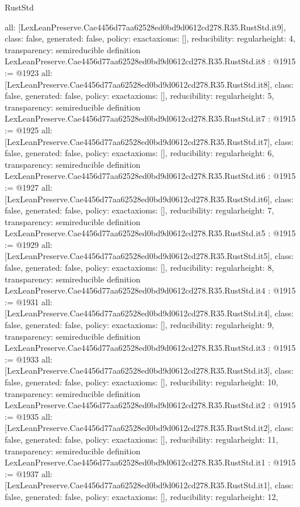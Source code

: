 \begin{lexlean}{RustStd}
\begin{coremodule}
{  all: [LexLeanPreserve.Cae4456d77aa62528ed0bd9d0612cd278.R35.RustStd.it9],
  class: false,
  generated: false,
  policy: exact{axioms: []},
  reducibility: regular{height: 4},
  transparency: semireducible
}
definition LexLeanPreserve.Cae4456d77aa62528ed0bd9d0612cd278.R35.RustStd.it8 : @1915 := @1923 {
  all: [LexLeanPreserve.Cae4456d77aa62528ed0bd9d0612cd278.R35.RustStd.it8],
  class: false,
  generated: false,
  policy: exact{axioms: []},
  reducibility: regular{height: 5},
  transparency: semireducible
}
definition LexLeanPreserve.Cae4456d77aa62528ed0bd9d0612cd278.R35.RustStd.it7 : @1915 := @1925 {
  all: [LexLeanPreserve.Cae4456d77aa62528ed0bd9d0612cd278.R35.RustStd.it7],
  class: false,
  generated: false,
  policy: exact{axioms: []},
  reducibility: regular{height: 6},
  transparency: semireducible
}
definition LexLeanPreserve.Cae4456d77aa62528ed0bd9d0612cd278.R35.RustStd.it6 : @1915 := @1927 {
  all: [LexLeanPreserve.Cae4456d77aa62528ed0bd9d0612cd278.R35.RustStd.it6],
  class: false,
  generated: false,
  policy: exact{axioms: []},
  reducibility: regular{height: 7},
  transparency: semireducible
}
definition LexLeanPreserve.Cae4456d77aa62528ed0bd9d0612cd278.R35.RustStd.it5 : @1915 := @1929 {
  all: [LexLeanPreserve.Cae4456d77aa62528ed0bd9d0612cd278.R35.RustStd.it5],
  class: false,
  generated: false,
  policy: exact{axioms: []},
  reducibility: regular{height: 8},
  transparency: semireducible
}
definition LexLeanPreserve.Cae4456d77aa62528ed0bd9d0612cd278.R35.RustStd.it4 : @1915 := @1931 {
  all: [LexLeanPreserve.Cae4456d77aa62528ed0bd9d0612cd278.R35.RustStd.it4],
  class: false,
  generated: false,
  policy: exact{axioms: []},
  reducibility: regular{height: 9},
  transparency: semireducible
}
definition LexLeanPreserve.Cae4456d77aa62528ed0bd9d0612cd278.R35.RustStd.it3 : @1915 := @1933 {
  all: [LexLeanPreserve.Cae4456d77aa62528ed0bd9d0612cd278.R35.RustStd.it3],
  class: false,
  generated: false,
  policy: exact{axioms: []},
  reducibility: regular{height: 10},
  transparency: semireducible
}
definition LexLeanPreserve.Cae4456d77aa62528ed0bd9d0612cd278.R35.RustStd.it2 : @1915 := @1935 {
  all: [LexLeanPreserve.Cae4456d77aa62528ed0bd9d0612cd278.R35.RustStd.it2],
  class: false,
  generated: false,
  policy: exact{axioms: []},
  reducibility: regular{height: 11},
  transparency: semireducible
}
definition LexLeanPreserve.Cae4456d77aa62528ed0bd9d0612cd278.R35.RustStd.it1 : @1915 := @1937 {
  all: [LexLeanPreserve.Cae4456d77aa62528ed0bd9d0612cd278.R35.RustStd.it1],
  class: false,
  generated: false,
  policy: exact{axioms: []},
  reducibility: regular{height: 12},
}
\end{coremodule}
\end{lexlean}

